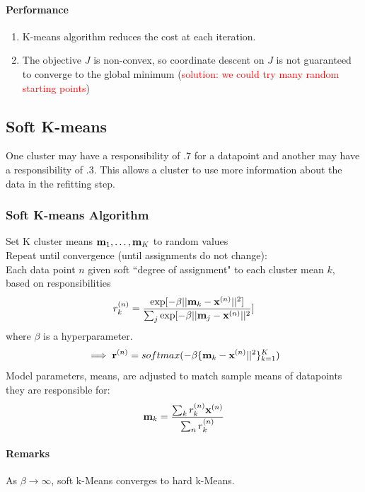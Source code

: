 \documentclass[11pt]{article}
\begin{document}
\paragraph{Performance}
\begin{enumerate}
	\item K-means algorithm reduces the cost at each iteration.
	\item The objective $J$ is non-convex, so coordinate descent on $J$ is not guaranteed to converge to the global minimum (\textcolor{red}{solution: we could try many random starting points})
\end{enumerate}

\subsection{Soft K-means}
One cluster may have a responsibility of $.7$ for a datapoint and another may have a responsibility of $.3$. This allows a cluster to use more information about the data in the refitting step.

\subsubsection{Soft K-means Algorithm}
 Set K cluster means $\textbf{m}_1, \hdots, \textbf{m}_K$ to random values \\
Repeat until convergence (until assignments do not change):\\
 Each data point $n$ given soft ``degree of assignment" to each cluster mean $k$, based on responsibilities
$$r_k^{(n)} = \frac{\exp[-\beta||\textbf{m}_k - \textbf{x}^{(n)}||^2]}{\sum_j \exp[-\beta||\textbf{m}_j - \textbf{x}^{(n)}||^2}]$$
where $\beta$ is a hyperparameter.
$$\implies \textbf{r}^{(n)} = softmax(-\beta\{\textbf{m}_k - \textbf{x}^{(n)}||^2 \} _{k=1}^K)$$
 Model parameters, means, are adjusted to match sample means of datapoints they are responsible for:
$$\textbf{m}_k = \frac{\sum_k r_k^{(n)}\textbf{x}^{(n)}}{\sum_n r_k^{(n)}}$$

\paragraph{Remarks}
As $\beta \rightarrow \infty$, soft k-Means converges to hard k-Means.
\end{document}
